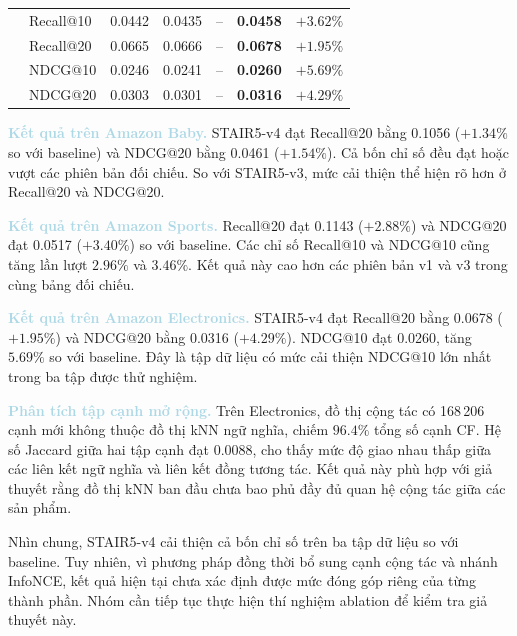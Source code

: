 \begin{table}[!htbp]
{\begin{tabular}{llccccc}
        & Recall@10 & 0.0442 & 0.0435 & -- & \textbf{0.0458} & $+3.62\%$ \\
        & Recall@20 & 0.0665 & 0.0666 & -- & \textbf{0.0678} & $+1.95\%$ \\
        & NDCG@10 & 0.0246 & 0.0241 & -- & \textbf{0.0260} & $+5.69\%$ \\
        & NDCG@20 & 0.0303 & 0.0301 & -- & \textbf{0.0316} & $+4.29\%$ \\

        \bottomrule
    \end{tabular}%
    }
\end{table}

\noindent\textcolor{lightblue}{\textbf{Kết quả trên Amazon Baby.}} STAIR5-v4 đạt Recall@20 bằng 0.1056 ($+1.34\%$ so với baseline) và NDCG@20 bằng 0.0461 ($+1.54\%$). Cả bốn chỉ số đều đạt hoặc vượt các phiên bản đối chiếu. So với STAIR5-v3, mức cải thiện thể hiện rõ hơn ở Recall@20 và NDCG@20.

\noindent\textcolor{lightblue}{\textbf{Kết quả trên Amazon Sports.}} Recall@20 đạt 0.1143 ($+2.88\%$) và NDCG@20 đạt 0.0517 ($+3.40\%$) so với baseline. Các chỉ số Recall@10 và NDCG@10 cũng tăng lần lượt $2.96\%$ và $3.46\%$. Kết quả này cao hơn các phiên bản v1 và v3 trong cùng bảng đối chiếu.

\noindent\textcolor{lightblue}{\textbf{Kết quả trên Amazon Electronics.}} STAIR5-v4 đạt Recall@20 bằng 0.0678 ($+1.95\%$) và NDCG@20 bằng 0.0316 ($+4.29\%$). NDCG@10 đạt 0.0260, tăng $5.69\%$ so với baseline. Đây là tập dữ liệu có mức cải thiện NDCG@10 lớn nhất trong ba tập được thử nghiệm.

\noindent\textcolor{lightblue}{\textbf{Phân tích tập cạnh mở rộng.}} Trên Electronics, đồ thị cộng tác có 168\,206 cạnh mới không thuộc đồ thị kNN ngữ nghĩa, chiếm $96.4\%$ tổng số cạnh CF. Hệ số Jaccard giữa hai tập cạnh đạt 0.0088, cho thấy mức độ giao nhau thấp giữa các liên kết ngữ nghĩa và liên kết đồng tương tác. Kết quả này phù hợp với giả thuyết rằng đồ thị kNN ban đầu chưa bao phủ đầy đủ quan hệ cộng tác giữa các sản phẩm.

Nhìn chung, STAIR5-v4 cải thiện cả bốn chỉ số trên ba tập dữ liệu so với baseline. Tuy nhiên, vì phương pháp đồng thời bổ sung cạnh cộng tác và nhánh InfoNCE, kết quả hiện tại chưa xác định được mức đóng góp riêng của từng thành phần. Nhóm cần tiếp tục thực hiện thí nghiệm ablation để kiểm tra giả thuyết này.


